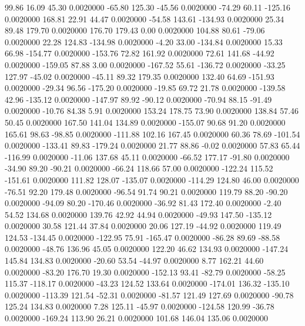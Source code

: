    99.86   16.09   45.30   0.0020000
  -65.80  125.30  -45.56   0.0020000
  -74.29   60.11 -125.16   0.0020000
  168.81   22.91   44.47   0.0020000
  -54.58  143.61 -134.93   0.0020000
   25.34   89.48  179.70   0.0020000
  176.70  179.43    0.00   0.0020000
  104.88   80.61  -79.06   0.0020000
   22.28  124.83 -134.98   0.0020000
   -4.20   33.00 -134.84   0.0020000
   15.33   66.98 -154.77   0.0020000
 -153.76   72.82  161.92   0.0020000
   72.61  141.68  -44.92   0.0020000
 -159.05   87.88    3.00   0.0020000
 -167.52   55.61 -136.72   0.0020000
  -33.25  127.97  -45.02   0.0020000
  -45.11   89.32  179.35   0.0020000
  132.40   64.69 -151.93   0.0020000
  -29.34   96.56 -175.20   0.0020000
  -19.85   69.72   21.78   0.0020000
 -139.58   42.96 -135.12   0.0020000
 -147.97   89.92  -90.12   0.0020000
  -70.94   88.15  -91.49   0.0020000
  -10.76   84.38    5.91   0.0020000
  153.24  178.75   73.90   0.0020000
  138.84   57.46   50.45   0.0020000
  167.50  141.04  134.89   0.0020000
 -155.07   90.68   91.20   0.0020000
  165.61   98.63  -98.85   0.0020000
 -111.88  102.16  167.45   0.0020000
   60.36   78.69 -101.54   0.0020000
 -133.41   89.83 -179.24   0.0020000
   21.77   88.86   -0.02   0.0020000
   57.83   65.44 -116.99   0.0020000
  -11.06  137.68   45.11   0.0020000
  -66.52  177.17  -91.80   0.0020000
  -34.90   89.20  -90.21   0.0020000
  -66.24  118.66   57.00   0.0020000
 -122.24  115.52 -151.61   0.0020000
  111.82  128.07 -135.07   0.0020000
 -114.29  124.80   46.00   0.0020000
  -76.51   92.20  179.48   0.0020000
  -96.54   91.74   90.21   0.0020000
  119.79   88.20  -90.20   0.0020000
  -94.09   80.20 -170.46   0.0020000
  -36.92   81.43  172.40   0.0020000
   -2.40   54.52  134.68   0.0020000
  139.76   42.92   44.94   0.0020000
  -49.93  147.50 -135.12   0.0020000
   30.58  121.44   37.84   0.0020000
   20.06  127.19  -44.92   0.0020000
  119.49  124.53 -134.45   0.0020000
 -122.95   75.91 -165.47   0.0020000
  -86.28   89.69  -88.58   0.0020000
  -48.76  136.96   45.05   0.0020000
  122.20   46.62  134.93   0.0020000
 -147.24  145.84  134.83   0.0020000
  -20.60   53.54  -44.97   0.0020000
    8.77  162.21   44.60   0.0020000
  -83.20  176.70   19.30   0.0020000
 -152.13   93.41  -82.79   0.0020000
  -58.25  115.37 -118.17   0.0020000
  -43.23  124.52  133.64   0.0020000
 -174.01  136.32 -135.10   0.0020000
 -113.39  121.54  -52.31   0.0020000
  -81.57  121.49  127.69   0.0020000
  -90.78  125.24  134.83   0.0020000
    7.28  125.11  -45.97   0.0020000
 -124.58  120.99  -36.78   0.0020000
 -169.24  113.90   26.21   0.0020000
  101.68  146.04  135.06   0.0020000
